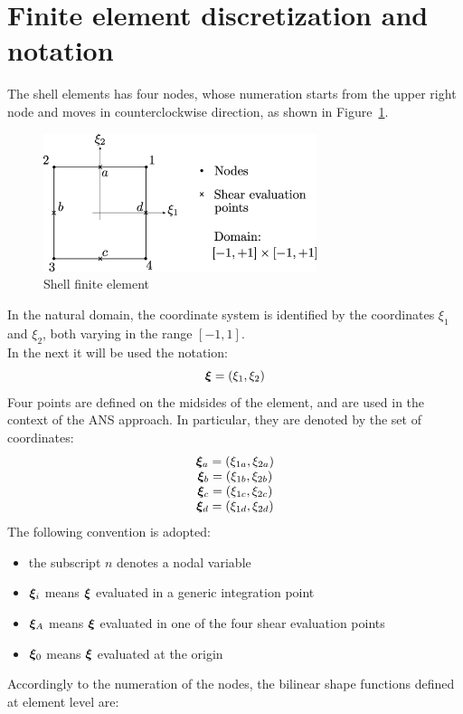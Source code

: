 \section{Finite element discretization and notation}
The shell elements has four nodes, whose numeration starts from the upper right node and moves in counterclockwise direction, as shown in Figure~\ref{fig:shell}.
\begin{figure}[htbp]
\centering
\includegraphics[width=8cm]{shellPic.eps}
\caption{Shell finite element}
\label{fig:shell}
\end{figure}
In the natural domain, the coordinate system is identified by the coordinates $\xi_1$ and $\xi_2$, both varying in the range $[-1, 1]$. \\
In the next it will be used the notation:
\begin{equation}
\bm{\xi} = \left( \xi_{1},\xi_{2} \right)
\end{equation}
Four points are defined on the midsides of the element, and are used in the context of the ANS approach. In particular, they are denoted by the set of coordinates:
\begin{equation}
\vvect{c}{
\T{\xi}_a = \plbr{\xi_{1a},\xi_{2a}} \\
\T{\xi}_b = \plbr{\xi_{1b},\xi_{2b}} \\
\T{\xi}_c = \plbr{\xi_{1c},\xi_{2c}} \\
\T{\xi}_d = \plbr{\xi_{1d},\xi_{2d}}
}
\label{eq:xiSep}
\end{equation}
The following convention is adopted:
\begin{itemize}
	\item the subscript $n$ denotes a nodal variable
  \item $\bm{\xi}_i$ means $\bm{\xi}$ evaluated in a generic integration point
  \item $\bm{\xi}_A$ means $\bm{\xi}$ evaluated in one of the four shear evaluation points
  \item $\bm{\xi}_0$ means $\bm{\xi}$ evaluated at the origin
\end{itemize}
Accordingly to the numeration of the nodes, the bilinear shape functions defined at element level are:
